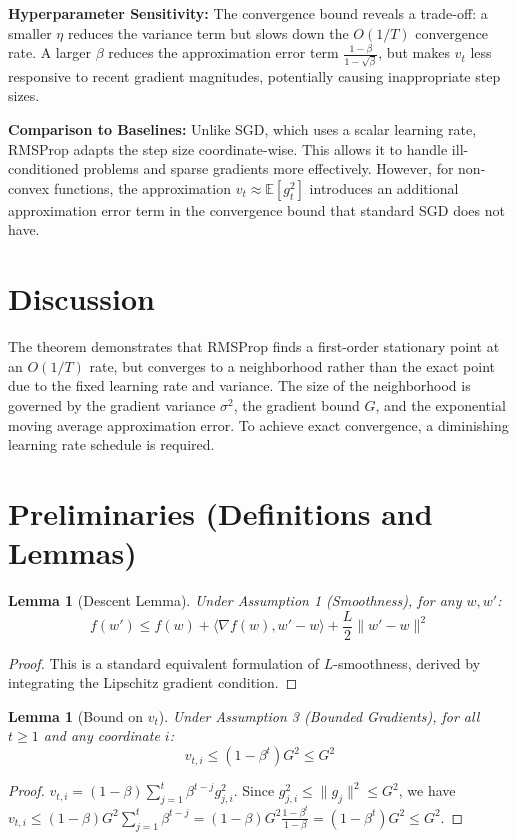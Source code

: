 \documentclass{article}
\newtheorem{lemma}[theorem]{Lemma}
\begin{document}
\textbf{Hyperparameter Sensitivity:} The convergence bound reveals a trade-off: a smaller $\eta$ reduces the variance term but slows down the $O(1/T)$ convergence rate. A larger $\beta$ reduces the approximation error term $\frac{1-\beta}{1-\sqrt{\beta}}$, but makes $v_t$ less responsive to recent gradient magnitudes, potentially causing inappropriate step sizes.

\textbf{Comparison to Baselines:} Unlike SGD, which uses a scalar learning rate, RMSProp adapts the step size coordinate-wise. This allows it to handle ill-conditioned problems and sparse gradients more effectively. However, for non-convex functions, the approximation $v_t \approx \mathbb{E}[g_t^2]$ introduces an additional approximation error term in the convergence bound that standard SGD does not have.

\section*{Discussion}
The theorem demonstrates that RMSProp finds a first-order stationary point at an $O(1/T)$ rate, but converges to a neighborhood rather than the exact point due to the fixed learning rate and variance. The size of the neighborhood is governed by the gradient variance $\sigma^2$, the gradient bound $G$, and the exponential moving average approximation error. To achieve exact convergence, a diminishing learning rate schedule is required.

\newpage
\section*{Preliminaries (Definitions and Lemmas)}
\begin{lemma}[Descent Lemma]
Under Assumption 1 (Smoothness), for any $w, w'$:
$$ f(w') \leq f(w) + \langle \nabla f(w), w' - w \rangle + \frac{L}{2} \|w' - w\|^2 $$
\end{lemma}
\begin{proof}
This is a standard equivalent formulation of $L$-smoothness, derived by integrating the Lipschitz gradient condition.
\end{proof}

\begin{lemma}[Bound on $v_t$]
Under Assumption 3 (Bounded Gradients), for all $t \geq 1$ and any coordinate $i$:
$$ v_{t,i} \leq (1-\beta^t) G^2 \leq G^2 $$
\end{lemma}
\begin{proof}
$v_{t,i} = (1-\beta) \sum_{j=1}^t \beta^{t-j} g_{j,i}^2$. Since $g_{j,i}^2 \leq \|g_j\|^2 \leq G^2$, we have $v_{t,i} \leq (1-\beta) G^2 \sum_{j=1}^t \beta^{t-j} = (1-\beta) G^2 \frac{1-\beta^t}{1-\beta} = (1-\beta^t)G^2 \leq G^2$.
\end{proof}
\end{document}
